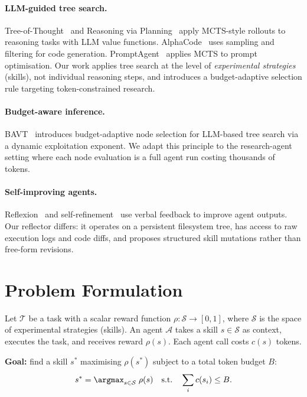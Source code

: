 \documentclass{article}
\begin{document}
\paragraph{LLM-guided tree search.}
Tree-of-Thought~\cite{tree_of_thought} and Reasoning via Planning~\cite{rap} apply MCTS-style rollouts to reasoning tasks with LLM value functions.
AlphaCode~\cite{alphacode} uses sampling and filtering for code generation.
PromptAgent~\cite{promptagent} applies MCTS to prompt optimisation.
Our work applies tree search at the level of \emph{experimental strategies} (skills), not individual reasoning steps, and introduces a budget-adaptive selection rule targeting token-constrained research.

\paragraph{Budget-aware inference.}
BAVT~\cite{bavt} introduces budget-adaptive node selection for LLM-based tree search via a dynamic exploitation exponent.
We adapt this principle to the research-agent setting where each node evaluation is a full agent run costing thousands of tokens.

\paragraph{Self-improving agents.}
Reflexion~\cite{reflexion} and self-refinement~\cite{self_refine} use verbal feedback to improve agent outputs.
Our reflector differs: it operates on a persistent filesystem tree, has access to raw execution logs and code diffs, and proposes structured skill mutations rather than free-form revisions.

\section{Problem Formulation}
\label{sec:problem}

Let $\mathcal{T}$ be a task with a scalar reward function $\rho: \mathcal{S} \to [0,1]$, where $\mathcal{S}$ is the space of experimental strategies (skills).
An agent $\mathcal{A}$ takes a skill $s \in \mathcal{S}$ as context, executes the task, and receives reward $\rho(s)$.
Each agent call costs $c(s)$ tokens.

\textbf{Goal:} find a skill $s^*$ maximising $\rho(s^*)$ subject to a total token budget $B$:
\[
    s^* = \argmax_{s \in \mathcal{S}} \; \rho(s) \quad \text{s.t.} \quad \sum_i c(s_i) \leq B.
\]
\end{document}
